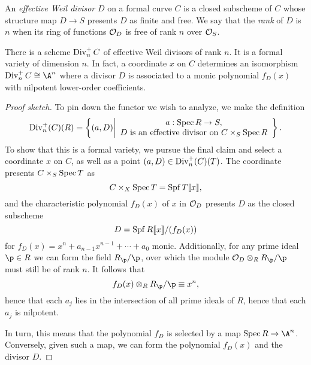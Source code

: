 \begin{definition}
An \textit{effective Weil divisor} $D$ on a formal curve $C$ is a closed subscheme of $C$ whose structure map $D \to S$ presents $D$ as finite and free.  We say that the \textit{rank} of $D$ is $n$ when its ring of functions $\mathcal{O}_D$ is free of rank $n$ over $\mathcal{O}_S$.
\end{definition}

\begin{lemma}
There is a scheme $\operatorname{Div}_n^+ C$ of effective Weil divisors of rank $n$.  It is a formal variety of dimension $n$.  In fact, a coordinate $x$ on $C$ determines an isomorphism $\Div_n^+ C \cong \A^n$ where a divisor $D$ is associated to a monic polynomial $f_D(x)$ with nilpotent lower-order coefficients.
\end{lemma}
\begin{proof}[Proof sketch]
To pin down the functor we wish to analyze, we make the definition \[\operatorname{Div}_n^+(C)(R) = \left\{(a, D) \middle| \begin{array}{c} a: \operatorname{Spec} R \to S, \\ \text{$D$ is an effective divisor on $C \times_S \operatorname{Spec} R$} \end{array} \right\}.\]  To show that this is a formal variety, we pursue the final claim and select a coordinate $x$ on $C$, as well as a point $(a, D) \in \operatorname{Div}_n^+(C)(T)$.  The coordinate presents $C \times_S \operatorname{Spec} T$ as \[C \times_X \operatorname{Spec} T = \operatorname{Spf} T\llbracket x \rrbracket,\] and the characteristic polynomial $f_D(x)$ of $x$ in $\mathcal{O}_D$ presents $D$ as the closed subscheme \[D = \operatorname{Spf} R\llbracket x \rrbracket / (f_D(x))\] for $f_D(x) = x^n + a_{n-1} x^{n-1} + \cdots + a_0$ monic.  Additionally, for any prime ideal $\p \in R$ we can form the field $R_{\p} / \p$, over which the module $\sheaf O_D \otimes_R R_{\p} / \p$ must still be of rank $n$.  It follows that \[f_D(x) \otimes_R R_{\p} / \p \equiv x^n,\] hence that each $a_j$ lies in the intersection of all prime ideals of $R$, hence that each $a_j$ is nilpotent.

In turn, this means that the polynomial $f_D$ is selected by a map $\Spec R \to \A^n$.  Conversely, given such a map, we can form the polynomial $f_D(x)$ and the divisor $D$.
\end{proof}

